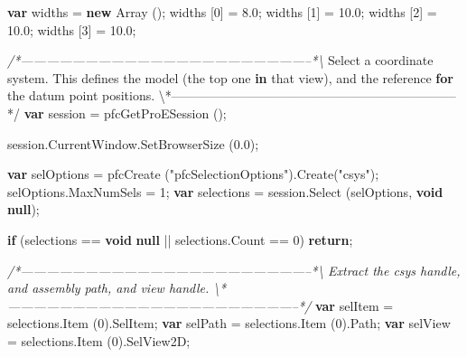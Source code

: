 \documentclass[]{article}
\newenvironment{Shaded}{}{}
\newcommand{\KeywordTok}[1]{\textcolor[rgb]{0.00,0.44,0.13}{\textbf{{#1}}}}
\newcommand{\DecValTok}[1]{\textcolor[rgb]{0.25,0.63,0.44}{{#1}}}
\newcommand{\FloatTok}[1]{\textcolor[rgb]{0.25,0.63,0.44}{{#1}}}
\newcommand{\StringTok}[1]{\textcolor[rgb]{0.25,0.44,0.63}{{#1}}}
\newcommand{\CommentTok}[1]{\textcolor[rgb]{0.38,0.63,0.69}{\textit{{#1}}}}
\newcommand{\OtherTok}[1]{\textcolor[rgb]{0.00,0.44,0.13}{{#1}}}
\newcommand{\FunctionTok}[1]{\textcolor[rgb]{0.02,0.16,0.49}{{#1}}}
\newcommand{\NormalTok}[1]{{#1}}
\begin{document}
\begin{Shaded}
\begin{Highlighting}[]
  \KeywordTok{var} \NormalTok{widths = }\KeywordTok{new} \FunctionTok{Array} \NormalTok{();}
  \NormalTok{widths [}\DecValTok{0}\NormalTok{] = }\FloatTok{8.0}\NormalTok{;}
  \NormalTok{widths [}\DecValTok{1}\NormalTok{] = }\FloatTok{10.0}\NormalTok{;}
  \NormalTok{widths [}\DecValTok{2}\NormalTok{] = }\FloatTok{10.0}\NormalTok{;}
  \NormalTok{widths [}\DecValTok{3}\NormalTok{] = }\FloatTok{10.0}\NormalTok{;}
   
\CommentTok{/*--------------------------------------------------------------------*\textbackslash{}}
  \NormalTok{Select a coordinate }\OtherTok{system}\NormalTok{. }\FunctionTok{This} \FunctionTok{defines} \FunctionTok{the} \FunctionTok{model} \NormalTok{(the top one}
  \KeywordTok{in} \NormalTok{that view), and the reference }\KeywordTok{for} \NormalTok{the datum point }\OtherTok{positions}\NormalTok{.}
\NormalTok{\textbackslash{}*--------------------------------------------------------------------*}\OtherTok{/}
  \KeywordTok{var} \NormalTok{session = }\FunctionTok{pfcGetProESession} \NormalTok{();}
  
  \OtherTok{session}\NormalTok{.}\OtherTok{CurrentWindow}\NormalTok{.}\FunctionTok{SetBrowserSize} \NormalTok{(}\FloatTok{0.0}\NormalTok{);}
  
  \KeywordTok{var} \NormalTok{selOptions = }\FunctionTok{pfcCreate} \NormalTok{(}\StringTok{"pfcSelectionOptions"}\NormalTok{).}\FunctionTok{Create}\NormalTok{(}\StringTok{"csys"}\NormalTok{);}
  \OtherTok{selOptions}\NormalTok{.}\FunctionTok{MaxNumSels} \NormalTok{= }\DecValTok{1}\NormalTok{;}
  \KeywordTok{var} \NormalTok{selections = }\OtherTok{session}\NormalTok{.}\FunctionTok{Select} \NormalTok{(selOptions, }\KeywordTok{void} \KeywordTok{null}\NormalTok{);}
  
  \KeywordTok{if} \NormalTok{(selections == }\KeywordTok{void} \KeywordTok{null} \NormalTok{|| }\OtherTok{selections}\NormalTok{.}\FunctionTok{Count} \NormalTok{== }\DecValTok{0}\NormalTok{)}
    \KeywordTok{return}\NormalTok{;}
  
\CommentTok{/*--------------------------------------------------------------------*\textbackslash{}    }
\CommentTok{  Extract the csys handle, and assembly path, and view handle.}
\CommentTok{\textbackslash{}*--------------------------------------------------------------------*/} 
  \KeywordTok{var} \NormalTok{selItem = }\OtherTok{selections}\NormalTok{.}\FunctionTok{Item} \NormalTok{(}\DecValTok{0}\NormalTok{).}\FunctionTok{SelItem}\NormalTok{;}
  \KeywordTok{var} \NormalTok{selPath = }\OtherTok{selections}\NormalTok{.}\FunctionTok{Item} \NormalTok{(}\DecValTok{0}\NormalTok{).}\FunctionTok{Path}\NormalTok{;  }
  \KeywordTok{var} \NormalTok{selView = }\OtherTok{selections}\NormalTok{.}\FunctionTok{Item} \NormalTok{(}\DecValTok{0}\NormalTok{).}\FunctionTok{SelView2D}\NormalTok{;}
  

\end{Highlighting}
\end{Shaded}
\end{document}
